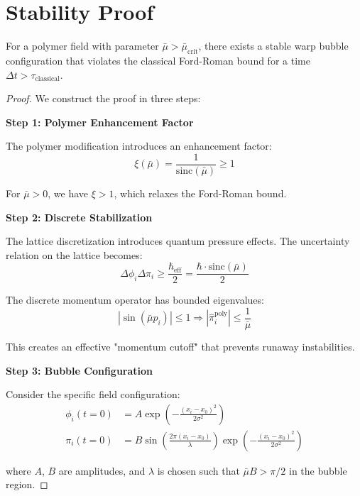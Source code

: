 \documentclass[12pt]{article}
\begin{document}
\section{Stability Proof}

\begin{theorem}
For a polymer field with parameter $\bar{\mu} > \bar{\mu}_{\text{crit}}$, there exists a stable warp bubble configuration that violates the classical Ford-Roman bound for a time $\Delta t > \tau_{\text{classical}}$.
\end{theorem}

\begin{proof}
We construct the proof in three steps:

\textbf{Step 1: Polymer Enhancement Factor}

The polymer modification introduces an enhancement factor:
\begin{equation}
\xi(\bar{\mu}) = \frac{1}{\text{sinc}(\bar{\mu})} \geq 1
\end{equation}

For $\bar{\mu} > 0$, we have $\xi > 1$, which relaxes the Ford-Roman bound.

\textbf{Step 2: Discrete Stabilization}

The lattice discretization introduces quantum pressure effects. The uncertainty relation on the lattice becomes:
\begin{equation}
\Delta \phi_i \Delta \pi_i \geq \frac{\hbar_{\text{eff}}}{2} = \frac{\hbar \cdot \text{sinc}(\bar{\mu})}{2}
\end{equation}

The discrete momentum operator has bounded eigenvalues:
\begin{equation}
|\sin(\bar{\mu} p_i)| \leq 1 \Rightarrow |\hat{\pi}_i^{\text{poly}}| \leq \frac{1}{\bar{\mu}}
\end{equation}

This creates an effective "momentum cutoff" that prevents runaway instabilities.

\textbf{Step 3: Bubble Configuration}

Consider the specific field configuration:
\begin{align}
\phi_i(t=0) &= A \exp\left(-\frac{(x_i - x_0)^2}{2\sigma^2}\right) \\
\pi_i(t=0) &= B \sin\left(\frac{2\pi(x_i - x_0)}{\lambda}\right) \exp\left(-\frac{(x_i - x_0)^2}{2\sigma^2}\right)
\end{align}

where $A$, $B$ are amplitudes, and $\lambda$ is chosen such that $\bar{\mu} B > \pi/2$ in the bubble region.


\end{proof}
\end{document}
